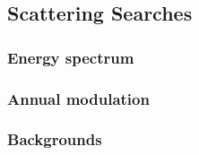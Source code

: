 \subsection{Scattering Searches}


\subsubsection{Energy spectrum}

\subsubsection{Annual modulation}

\subsubsection{Backgrounds}
